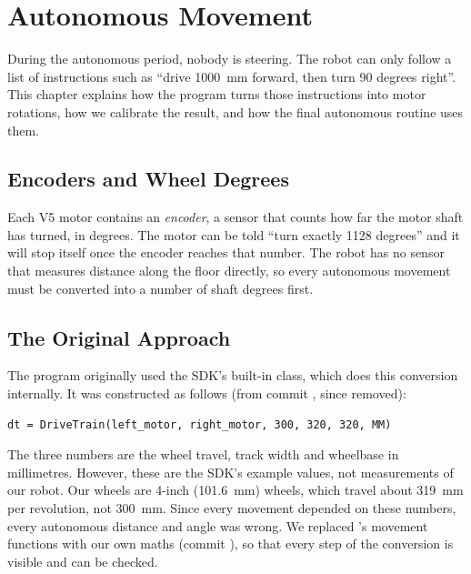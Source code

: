 \chapter{Autonomous Movement}
\label{ch:movement}

During the autonomous period, nobody is steering. The robot can only follow a
list of instructions such as ``drive 1000~mm forward, then turn 90 degrees
right''. This chapter explains how the program turns those instructions into
motor rotations, how we calibrate the result, and how the final autonomous
routine uses them.

\section{Encoders and Wheel Degrees}
\label{sec:encoders}

Each V5 motor contains an \emph{encoder}, a sensor that counts how far the motor
shaft has turned, in degrees. The motor can be told ``turn exactly 1128
degrees'' and it will stop itself once the encoder reaches that number. The
robot has no sensor that measures distance along the floor directly, so every
autonomous movement must be converted into a number of shaft degrees first.

\section{The Original Approach}
\label{sec:original}

The program originally used the SDK's built-in  class, which
does this conversion internally. It was constructed as follows (from commit
, since removed):

\begin{lstlisting}[caption={Original drivetrain construction, \code{src/main.py} at \commit{4f76b82}.},label=lst:olddt,numbers=none]
dt = DriveTrain(left_motor, right_motor, 300, 320, 320, MM)
\end{lstlisting}

The three numbers are the wheel travel, track width and wheelbase in
millimetres. However, these are the SDK's example values, not measurements of
our robot. Our wheels are 4-inch (101.6~mm) wheels, which travel about 319~mm
per revolution, not 300~mm. Since every movement depended on these numbers,
every autonomous distance and angle was wrong. We replaced 's
movement functions with our own maths (commit ), so that every
step of the conversion is visible and can be checked.

